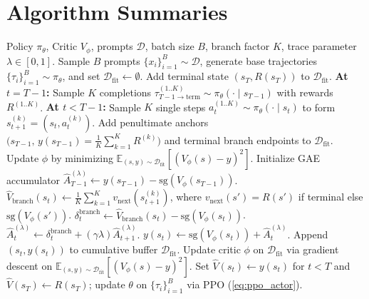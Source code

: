\documentclass[11pt,a4paper]{article}
\newcommand{\E}{\mathbb{E}}
\newcommand{\sg}{\text{sg}}
\begin{document}
\section{Algorithm Summaries}

\begin{algorithm}[H]
\caption{Variant 1: 1-Step Fitted Backward Induction PPO ($\text{FBI}(\lambda)$-PPO)}
\label{alg:fbi_ppo}
\begin{algorithmic}[1]
\Require Policy $\pi_\theta$, Critic $V_\phi$, prompts $\mathcal{D}$, batch size $B$, branch factor $K$, trace parameter $\lambda \in [0, 1]$.
    \State Sample $B$ prompts $\{x_i\}_{i=1}^B \sim \mathcal{D}$, generate base trajectories $\{\tau_i\}_{i=1}^B \sim \pi_\theta$, and set $\mathcal{D}_{\text{fit}} \leftarrow \emptyset$.
        \State Add terminal state $(s_T, R(s_T))$ to $\mathcal{D}_{\text{fit}}$.
        \State \textbf{At $t = T - 1$:} Sample $K$ completions $\tau_{T-1 \to \text{term}}^{(1..K)} \sim \pi_\theta(\cdot \mid s_{T-1})$ with rewards $R^{(1..K)}$.
        \State \textbf{At $t < T - 1$:} Sample $K$ single steps $a_t^{(1..K)} \sim \pi_\theta(\cdot \mid s_t)$ to form $s_{t+1}^{(k)} = (s_t, a_t^{(k)})$.
    \EndFor
    \State Add penultimate anchors $\big(s_{T-1}, \, y(s_{T-1}) = \frac{1}{K}\sum_{k=1}^K R^{(k)}\big)$ and terminal branch endpoints to $\mathcal{D}_{\text{fit}}$.
    \State Update $\phi$ by minimizing $\E_{(s, y) \sim \mathcal{D}_{\text{fit}}}\!\left[(V_\phi(s) - y)^2\right]$.
    \State Initialize GAE accumulator $\hat{A}_{T-1}^{(\lambda)} \leftarrow y(s_{T-1}) - \sg(V_\phi(s_{T-1}))$.
            \State $\hat{V}_{\text{branch}}(s_t) \leftarrow \frac{1}{K}\sum_{k=1}^K v_{\text{next}}\!\left(s_{t+1}^{(k)}\right)$, where $v_{\text{next}}(s') = R(s')$ if terminal else $\sg(V_\phi(s'))$.
            \State $\delta_t^{\text{branch}} \leftarrow \hat{V}_{\text{branch}}(s_t) - \sg(V_\phi(s_t))$.
            \State $\hat{A}_t^{(\lambda)} \leftarrow \delta_t^{\text{branch}} + (\gamma \lambda) \hat{A}_{t+1}^{(\lambda)}$.
            \State $y(s_t) \leftarrow \sg(V_\phi(s_t)) + \hat{A}_t^{(\lambda)}$.
            \State Append $(s_t, y(s_t))$ to cumulative buffer $\mathcal{D}_{\text{fit}}$.
        \EndFor
        \State Update critic $\phi$ on $\mathcal{D}_{\text{fit}}$ via gradient descent on $\E_{(s, y) \sim \mathcal{D}_{\text{fit}}}\!\left[(V_\phi(s) - y)^2\right]$.
    \EndFor
    \State Set $\hat{V}(s_t) \leftarrow y(s_t)$ for $t < T$ and $\hat{V}(s_T) \leftarrow R(s_T)$; update $\theta$ on $\{\tau_i\}_{i=1}^B$ via PPO (\cref{eq:ppo_actor}).
\EndFor
\end{algorithmic}
\end{algorithm}
\end{document}
